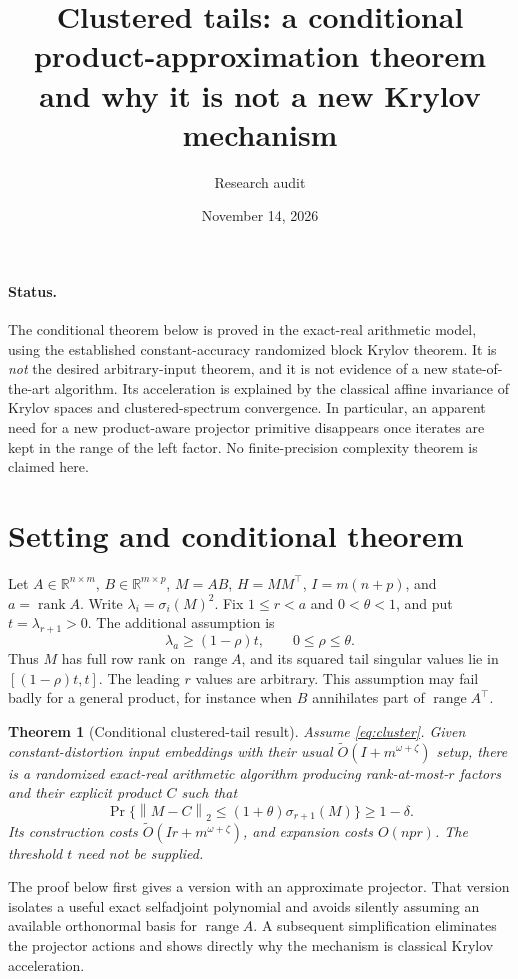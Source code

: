 \documentclass[11pt]{article}
\title{Clustered tails: a conditional product-approximation theorem and why it is not a new Krylov mechanism}
\author{Research audit}
\date{November 14, 2026}
\newtheorem{theorem}{Theorem}
\newcommand{\R}{\mathbb R}
\newcommand{\norm}[1]{\left\lVert #1\right\rVert}
\newcommand{\range}{\operatorname{range}}
\newcommand{\rank}{\operatorname{rank}}
\newcommand{\tO}{\widetilde O}
\begin{document}
\maketitle

\paragraph{Status.}
The conditional theorem below is proved in the exact-real arithmetic model,
using the established constant-accuracy randomized block Krylov theorem.
It is \emph{not} the desired arbitrary-input theorem, and it is not evidence of
a new state-of-the-art algorithm. Its acceleration is explained by the
classical affine invariance of Krylov spaces and clustered-spectrum
convergence. In particular, an apparent need for a new product-aware
projector primitive disappears once iterates are kept in the range of the
left factor. No finite-precision complexity theorem is claimed here.

\section{Setting and conditional theorem}
Let \(A\in\R^{n\times m}\), \(B\in\R^{m\times p}\),
\(M=AB\), \(H=MM^\top\), \(I=m(n+p)\), and
\(a=\rank A\). Write \(\lambda_i=\sigma_i(M)^2\).
Fix \(1\le r<a\) and \(0<\theta<1\), and put
\(t=\lambda_{r+1}>0\). The additional assumption is
\begin{equation}\label{eq:cluster}
 \lambda_a\ge(1-\rho)t,\qquad 0\le\rho\le\theta.
\end{equation}
Thus \(M\) has full row rank on \(\range A\), and its squared
tail singular values lie in \([(1-\rho)t,t]\). The leading
\(r\) values are arbitrary. This assumption may fail badly for a
general product, for instance when \(B\) annihilates part of
\(\range A^\top\).

\begin{theorem}[Conditional clustered-tail result]\label{thm:cluster}
Assume \eqref{eq:cluster}. Given constant-distortion input embeddings
with their usual \(\tO(I+m^{\omega+\zeta})\) setup, there is a
randomized exact-real arithmetic algorithm producing rank-at-most-\(r\)
factors and their explicit product \(C\) such that
\[
 \Pr\{\norm{M-C}_2\le(1+\theta)\sigma_{r+1}(M)\}\ge1-\delta.
\]
Its construction costs
\(\tO(Ir+m^{\omega+\zeta})\), and expansion costs \(O(npr)\).
The threshold \(t\) need not be supplied.
\end{theorem}

The proof below first gives a version with an approximate projector. That
version isolates a useful exact selfadjoint polynomial and avoids silently
assuming an available orthonormal basis for \(\range A\). A subsequent
simplification eliminates the projector actions and shows directly why the
mechanism is classical Krylov acceleration.
\end{document}
